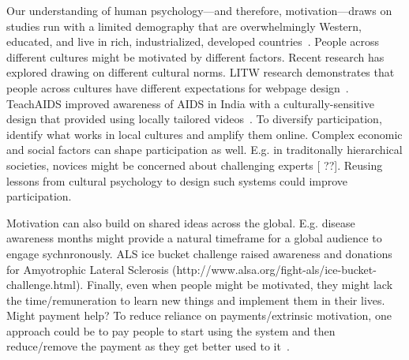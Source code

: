Our understanding of human psychology---and therefore, motivation---draws on studies run with a limited demography that are overwhelmingly Western, educated, and live in rich, industrialized, developed countries~\cite{Henrich2010a}. People across different cultures might be motivated by different factors. Recent research has explored drawing on different cultural norms. LITW research demonstrates that people across cultures have different expectations for webpage design~\cite{Reinecke2014a}. TeachAIDS improved awareness of AIDS in India with a culturally-sensitive design that provided using locally tailored videos~\cite{sorcar2009teaching}. To diversify participation, identify what works in local cultures and amplify them online. Complex economic and social factors can shape participation as well. E.g. in traditonally hierarchical societies, novices might be concerned about challenging experts [ ??]. Reusing lessons from cultural psychology to design such systems could improve participation.


Motivation can also build on shared ideas across the global. E.g. disease awareness months might provide a natural timeframe for a global audience to engage sychnronously. ALS ice bucket challenge raised awareness and donations for Amyotrophic Lateral Sclerosis (http://www.alsa.org/fight-als/ice-bucket-challenge.html). Finally, even when people might be motivated, they might lack the time/remuneration to learn new things and implement them in their lives. Might payment help? To reduce reliance on payments/extrinsic motivation, one approach could be to pay people to start using the system and then reduce/remove the payment as they get better used to it~\cite{Resnick2011}. 

